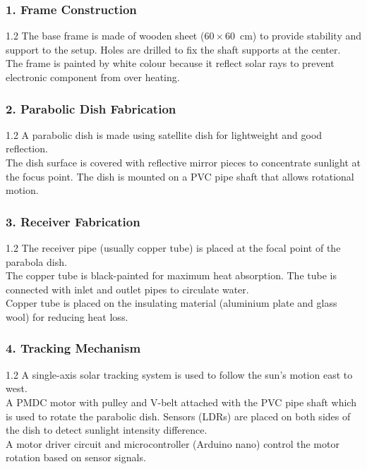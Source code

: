 \documentclass[12pt,a4paper]{article}
\begin{document}
\subsubsection*{1. Frame Construction}
\noindent
\begin{spacing}{1.2}
{\fontsize{10.2}{14.5}\selectfont
The base frame is made of wooden sheet ($60 \times 60$~cm) to provide stability and support to the setup. Holes are drilled to fix the shaft supports at the center.\\[2.5mm]
The frame is painted by white colour because it reflect solar rays to prevent electronic component from over heating.
}
\end{spacing}

\vspace{4mm}
\subsubsection*{2. Parabolic Dish Fabrication}
\noindent
\begin{spacing}{1.2}
{\fontsize{10.2}{14.5}\selectfont
A parabolic dish is made using satellite dish for lightweight and good reflection.\\[2.5mm]
The dish surface is covered with reflective mirror pieces to concentrate sunlight at the focus point. The dish is mounted on a PVC pipe shaft that allows rotational motion.
}
\end{spacing}

\vspace{4mm}
\subsubsection*{3. Receiver Fabrication}
\noindent
\begin{spacing}{1.2}
{\fontsize{10.2}{14.5}\selectfont
The receiver pipe (usually copper tube) is placed at the focal point of the parabola dish.\\[2.5mm]
The copper tube is black-painted for maximum heat absorption. The tube is connected with inlet and outlet pipes to circulate water.\\[2.5mm]
Copper tube is placed on the insulating material (aluminium plate and glass wool) for reducing heat loss.
}
\end{spacing}

\vspace{4mm}
\subsubsection*{4. Tracking Mechanism}
\noindent
\begin{spacing}{1.2}
{\fontsize{10.2}{14.5}\selectfont
A single-axis solar tracking system is used to follow the sun's motion east to west.\\[2.5mm]
A PMDC motor with pulley and V-belt attached with the PVC pipe shaft which is used to rotate the parabolic dish. Sensors (LDRs) are placed on both sides of the dish to detect sunlight intensity difference.\\[2.5mm]
A motor driver circuit and microcontroller (Arduino nano) control the motor rotation based on sensor signals.
}
\end{spacing}
\clearpage
\end{document}
